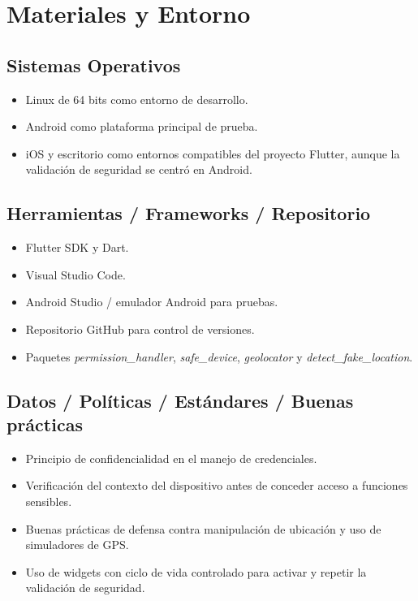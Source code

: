 \documentclass[12pt, a4paper]{article}
\begin{document}
\section{Materiales y Entorno}

\subsection*{Sistemas Operativos}
\begin{itemize}[topsep=4pt]
    \item Linux de 64 bits como entorno de desarrollo.
    \item Android como plataforma principal de prueba.
    \item iOS y escritorio como entornos compatibles del proyecto Flutter, aunque la validación de seguridad se centró en Android.
\end{itemize}

\subsection*{Herramientas / Frameworks / Repositorio}
\begin{itemize}[topsep=4pt]
    \item Flutter SDK y Dart.
    \item Visual Studio Code.
    \item Android Studio / emulador Android para pruebas.
    \item Repositorio GitHub para control de versiones.
    \item Paquetes \textit{permission\_handler}, \textit{safe\_device}, \textit{geolocator} y \textit{detect\_fake\_location}.
\end{itemize}

\subsection*{Datos / Políticas / Estándares / Buenas prácticas}
\begin{itemize}[topsep=4pt]
    \item Principio de confidencialidad en el manejo de credenciales.
    \item Verificación del contexto del dispositivo antes de conceder acceso a funciones sensibles.
    \item Buenas prácticas de defensa contra manipulación de ubicación y uso de simuladores de GPS.
    \item Uso de widgets con ciclo de vida controlado para activar y repetir la validación de seguridad.
\end{itemize}
\end{document}
